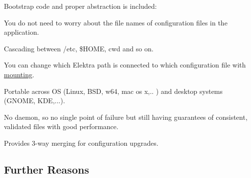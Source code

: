 \begin{DoxyItemize}
\item Bootstrap code and proper abstraction is included\+:
\begin{DoxyItemize}
\item You do not need to worry about the file names of configuration files in the application.
\item Cascading between {\ttfamily /etc}, {\ttfamily \$\+H\+O\+M\+E}, {\ttfamily cwd} and so on.
\item You can change which Elektra path is connected to which configuration file with \hyperlink{md_doc_help_elektra-mounting_doc_help_elektra-mounting_md}{mounting}.
\item Portable across O\+S (Linux, B\+S\+D, w64, mac os x,.. ) and desktop systems (G\+N\+O\+M\+E, K\+D\+E,...).
\end{DoxyItemize}
\item No daemon, so no single point of failure but still having guarantees of consistent, validated files with good performance.
\item Provides 3-\/way merging for configuration upgrades.
\end{DoxyItemize}

\subsection*{Further Reasons}


